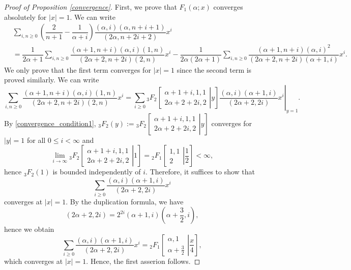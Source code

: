 \documentclass[11pt,a4,leqno]{amsart}
\theoremstyle{my theoremstyle}
\theoremstyle{dfn}
\theoremstyle{remark}
\renewcommand{\1}{\mathbbm{1}}
\newcommand{\al}{\alpha}
\numberwithin{equation}{section}
\begin{document}
\begin{proof}[Proof of Proposition \ref{convergence}]
First, we prove that $F_1(\alpha; x)$ converges absolutely for $|x|=1$.  
We can write
\begin{align*}
&\sum_{i, n \ge 0} \left(\dfrac{2}{n+1} - \dfrac{1}{\al+i} \right) \dfrac{(\al, i)(\al, n+i+1)}{(2\al, n+2i+2)} x^i \\
&=\dfrac1{2 \alpha+1} \sum_{i, n \ge 0} \dfrac{(\alpha+1, n+i)(\alpha, i)(1, n)}{(2\alpha+2, n + 2i)(2, n)}x^i
-
\dfrac{1}{2 \alpha(2 \alpha+1)} \sum_{i, n \ge 0} \dfrac{(\alpha+1, n+i) (\alpha, i)^2}{(2 \alpha+2, n+2i)(\alpha+1, i)}x^i. 
\end{align*}
We only prove that the first term converges for $|x|=1$ since the second term is proved similarly. 
We can write  
$$\sum_{i, n \ge 0} \dfrac{(\alpha+1, n+i)(\alpha, i)(1, n)}{(2\alpha+2, n + 2i)(2, n)}x^i=
\left.
\sum_{i \ge 0}{_{3}F_{2}}\left[ \left. 
\begin{matrix}
\alpha+1+i,1,1 \\
2\alpha+2+2i, 2
\end{matrix}
\right| y
\right] \dfrac{(\alpha, i)(\alpha+1, i)}{(2\alpha+2, 2i)}x^i \right|_{y=1}.  $$
By \eqref{convergence_condition1}, ${}_3F_2(y):={_{3}F_{2}}\left[ \left. 
\begin{matrix}
\alpha+1+i,1,1 \\
2\alpha+2+2i, 2
\end{matrix}
\right| y
\right]$ converges for $|y|=1$ for all $0 \leq i < \infty$ and
$$\lim_{i \to \infty}{_{3}F_{2}}\left[ \left. 
\begin{matrix}
\alpha+1+i,1,1 \\
2\alpha+2+2i, 2
\end{matrix}
\right| 1
\right] 
={_{2}F_{1}}\left[ \left. 
\begin{matrix}
1,1 \\
2
\end{matrix}
\right| \frac12
\right] < \infty, $$
hence 
${_{3}F_{2}}(1)$
is bounded independently of $i$. 
Therefore, it suffices to show that
$$\sum_{i \ge 0} \dfrac{(\alpha, i)(\alpha+1, i)}{(2\alpha+2, 2i)}x^i$$
converges at $|x|=1$.  
By the duplication formula, we have 
$$(2 \alpha +2, 2i)=2^{2i}(\alpha+1, i) \left(\alpha+\frac32, i \right), $$
hence we obtain 
$$\sum_{i \ge 0} \dfrac{(\alpha, i)(\alpha+1, i)}{(2\alpha+2, 2i)}x^i={_{2}F_{1}}\left[ \left. 
\begin{matrix}
\alpha, 1 \\
\alpha+ \frac32
\end{matrix}
\right| \frac{x}4
\right], $$
which converges at $|x|=1$. 
Hence, the first asserion follows. 


\end{proof}
\end{document}
